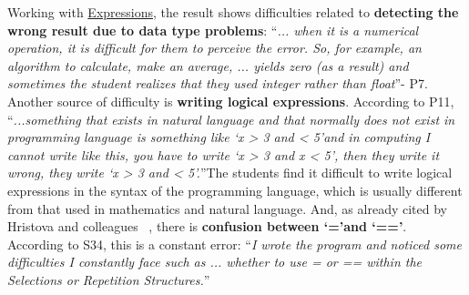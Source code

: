 \documentclass[sigconf]{acmart}
\begin{document}
Working with \underline{Expressions}, the result shows difficulties related to \textbf{detecting the wrong result due to data type problems}: \textquotedblleft \textit{... when it is a numerical operation, it is difficult for them to perceive the error. So, for example, an algorithm to calculate, make an average, ... yields zero (as a result) and sometimes the student realizes that they used integer rather than float}\textquotedblright \space - P7. Another source of difficulty is \textbf{writing logical expressions}. According to P11, \textquotedblleft \textit{...something that exists in natural language and that normally does not exist in programming language is something like \textquoteleft{x > 3 and < 5}\textquoteright \space and in computing I cannot write like this, you have to write \textquoteleft{x > 3 and x < 5}\textquoteright, then they write it wrong, they write \textquoteleft{x > 3 and < 5}\textquoteright.}\textquotedblright \space The students find it difficult to write logical expressions in the syntax of the programming language, which is usually different from that used in mathematics and natural language. And, as already cited by Hristova and colleagues ~\cite{Hristova03}, there is \textbf{confusion between \textquoteleft{=}\textquoteright \space and \textquoteleft{==}\textquoteright}. According to S34, this is a constant error: \textquotedblleft \textit{I wrote the program and noticed some difficulties I constantly face such as ... whether to use = or == within the Selections or Repetition Structures.}\textquotedblright
\end{document}
